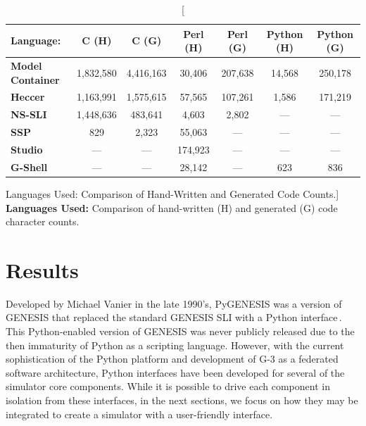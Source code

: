 \documentclass[12pt]{article}
\begin{document}
\begin{table}[h]
  \centering
  \begin{tabular}{|l|c|c|c|c|c|c|}
    \hline

    \rule[-2ex]{0mm}{5ex}
    {\bf Language:}
    & {\bf C (H)}
    & {\bf C (G)}
    & {\bf Perl (H)}
    & {\bf Perl (G)}
    & {\bf Python (H)}
    & {\bf Python (G)} \\

    \hline

    \rule[-2ex]{0mm}{5ex}
    {\bf Model\,Container}
    & 1,832,580
    & 4,416,163
    & 30,406
    & 207,638
    & 14,568
    & 250,178 \\

    \rule[-2ex]{0mm}{5ex}
    {\bf Heccer}
    & 1,163,991
    & 1,575,615
    & 57,565
    & 107,261
    & 1,586
    & 171,219 \\

    \rule[-2ex]{0mm}{5ex}
    {\bf NS-SLI}
    & 1,448,636
    & 483,641
    & 4,603
    & 2,802
    & ---
    & --- \\

    \rule[-2ex]{0mm}{5ex}
    {\bf SSP}
    & 829
    & 2,323
    & 55,063
    & ---
    & ---
    & --- \\

    \rule[-2ex]{0mm}{5ex}
    {\bf Studio}
    & ---
    & ---
    & 174,923
    & ---
    & ---
    & --- \\

    \rule[-2ex]{0mm}{5ex}
    {\bf G-Shell}
    & ---
    & ---
    & 28,142
    & ---
    & 623
    & 836 \\

    \hline
  \end{tabular}
  \caption
  [Languages Used: Comparison of Hand-Written and Generated Code Counts.]
  {
    {\bf Languages Used:} Comparison of hand-written (H) and generated (G)  code character counts.
  }
  \label{tab:cbi-codecounts}
\end{table}


\section{Results}

Developed by Michael Vanier in the late 1990's, PyGENESIS was a
version of GENESIS that replaced the standard GENESIS SLI with a
Python interface\,\cite{vanier97:_genes_python}.  This Python-enabled
version of GENESIS was never publicly released due to the then
immaturity of Python as a scripting language.  However, with the
current sophistication of the Python platform and development of G-3
as a federated software architecture, Python interfaces have been
developed for several of the simulator core components.  While it is
possible to drive each component in isolation from these interfaces,
in the next sections, we focus on how they may be integrated to create
a simulator with a user-friendly interface.
\end{document}
